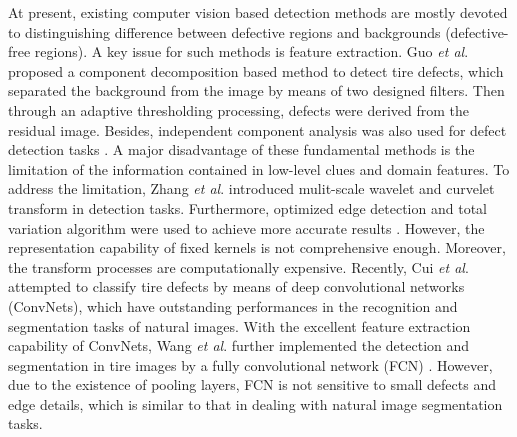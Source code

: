\documentclass{article}
\begin{document}
At present, existing computer vision based detection methods are mostly devoted to distinguishing difference between defective regions and backgrounds (defective-free regions). A key issue for such methods is feature extraction. Guo {\it et al}. \cite{guo2012tire} proposed a component decomposition based method to detect tire defects, which separated the background from the image by means of two designed filters. Then through an adaptive thresholding processing, defects were derived from the residual image. Besides, independent component analysis was also used for defect detection tasks \cite{cui2016defect,cui2016novel}. A major disadvantage of these fundamental methods is the limitation of the information contained in low-level clues and domain features. To address the limitation, Zhang {\it et al}. \cite{zhang2013defect,zhang2015automatic} introduced mulit-scale wavelet and curvelet transform in detection tasks. Furthermore, optimized edge detection and total variation algorithm were used to achieve more accurate results \cite{yan2013detection}. However, the representation capability of fixed kernels is not comprehensive enough. Moreover, the transform processes are computationally expensive. Recently, Cui {\it et al}. \cite{cui2018tire} attempted to classify tire defects by means of deep convolutional networks (ConvNets), which have outstanding performances in the recognition and segmentation tasks of natural images. With the excellent feature extraction capability of ConvNets, Wang {\it et al}. \cite{wang2019tire} further implemented the detection and segmentation in tire images by a fully convolutional network (FCN) \cite{long2015fully}. However, due to the existence of pooling layers, FCN is not sensitive to small defects and edge details, which is similar to that in dealing with natural image segmentation tasks.
\end{document}
